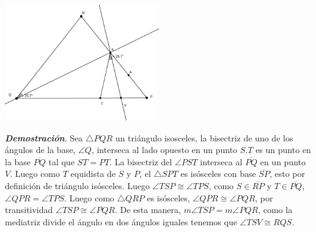 \documentclass{report}
\begin{document}
\begin{enumerate}
        \begin{center}
            \includegraphics*[height=5cm]{images/figura2.png}
        \end{center}
        \textit{\textbf{Demostración}}. Sea $\triangle P Q R$ un triángulo isosceles, la bisectriz de uno de los ángulos de la base, $\angle Q$, interseca al lado opuesto en un punto $S . T$ es un punto en la base $\overline{P Q}$ tal que $S T=P T$. La bisectriz del $\angle P S T$ interseca al $\overline{P Q}$ en un punto $V$. Luego como $T$ equidista de $S$ y $P$, el $\triangle SPT$ es isósceles con base $\overline{SP}$, esto por definición de triángulo isósceles. Luego $\angle TSP \cong \angle TPS$, como $S \in \overline{RP}$ y $T \in \overline{PQ}$, $\angle QPR = \angle TPS$. Luego como $\triangle QRP$ es isósceles, $\angle QPR \cong \angle PQR$, por transitividad $\angle TSP \cong \angle PQR$. De esta manera, $m\angle TSP = m\angle PQR$, como la mediatriz divide el ángulo en dos ángulos iguales tenemos que $\angle TSV \cong RQS$.

    \end{enumerate}
\end{document}
